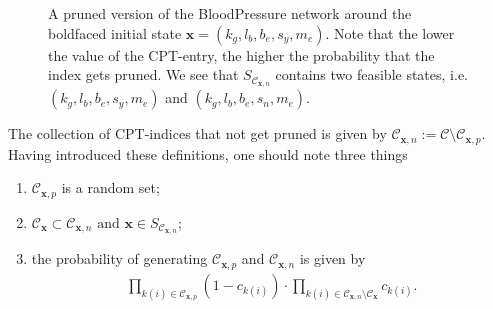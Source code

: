 \documentclass[a4paper, twoside, 11pt]{report}
\theoremstyle{plain}
\theoremstyle{definition}
\theoremstyle{remark}
\newcommand{\C}{{\mathcal C}}
\newcommand{\bfx}{{\mathbf{x}}}
\begin{document}
\begin{figure}[t!]
\begin{adjustbox}{width=\textwidth}
\end{adjustbox}
\caption{A pruned version of the BloodPressure network around the boldfaced initial state $\bfx = (k_g, l_b, b_e, s_y, m_e)$. Note that the lower the value of the CPT-entry, the higher the probability that the index gets pruned. We see that $S_{\C_{\bfx,n}}$ contains two feasible states, i.e. $(k_g, l_b, b_e, s_y, m_e)$ and $(k_g, l_b, b_e, s_n, m_e)$.}
\label{pruning}
\end{figure}

The collection of CPT-indices that not get pruned is given by $\C_{\bfx,n}:=\C \setminus \C_{\bfx,p}$. Having introduced these definitions, one should note three things
\begin{enumerate}
\item $\C_{\bfx,p}$ is a random set;
\item $\C_\bfx \subset \C_{\bfx,n} \text{ and } \bfx \in S_{\C_{\bfx,n}}$;
\item the probability of generating $\C_{\bfx,p}$ and $\C_{\bfx,n}$ is given by
\begin{align*}
\prod_{k(i) \in \C_{\bfx, p}}(1-c_{k(i)}) \cdot \prod_{k(i) \in \C_{\bfx, n} \setminus \C_{\bfx}} c_{k(i)}.
\end{align*}
\end{enumerate}
\end{document}
